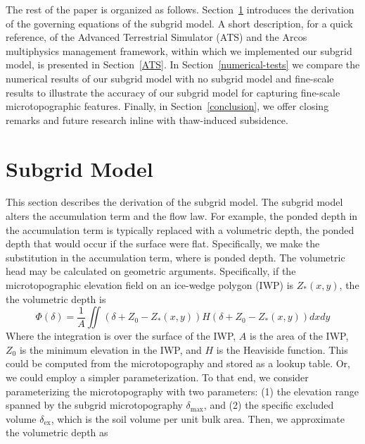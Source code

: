 \documentclass[review,11pt]{elsarticle}
\begin{document}
The rest of the paper is organized as follows. Section~\ref{subgridmodel} introduces the derivation of the governing equations of the subgrid model. A short description, for a quick reference, of the Advanced Terrestrial Simulator (ATS) and the Arcos multiphysics management framework, within which we implemented our subgrid model, is presented in Section~\ref{ATS}. In Section~\ref{numerical-tests} we compare the numerical results of our subgrid model with no subgrid model and fine-scale results to illustrate the accuracy of our subgrid model for capturing fine-scale microtopographic features. Finally, in Section~\ref{conclusion}, we offer closing remarks and future research inline with thaw-induced subsidence.





\section{Subgrid Model}\label{subgridmodel}
This section describes the derivation of the subgrid model. The subgrid model alters the accumulation term and the flow law. For example, the ponded depth in the accumulation term is typically replaced with a volumetric depth, the ponded depth that would occur if the surface were flat. Specifically, we make the substitution in the accumulation term, where is ponded depth. The volumetric head may be calculated on geometric arguments. Specifically, if the microtopographic elevation field on an ice-wedge polygon (IWP) is $Z_*(x,y)$, the the volumetric depth is
\begin{equation}\label{volumetric-depth1}
\Phi (\delta) = \frac{1}{A} \iint \left( \delta + Z_0 - Z_*(x,y) \right ) H \left( \delta + Z_0 - Z_*(x,y) \right ) dx dy
\end{equation}
Where the integration is over the surface of the IWP, $A$ is the area of the IWP, $Z_0$ is the minimum elevation in the IWP, and $H$ is the Heaviside function. This could be computed from the microtopography and stored as a lookup table. Or, we could employ a simpler parameterization. To that end, we consider parameterizing the microtopography with two parameters: (1) the elevation range spanned by the subgrid microtopography $\delta_\text{max}$, and (2) the specific excluded volume $\delta_\text{ex}$, which is the soil volume per unit bulk area. Then, we approximate the volumetric depth as
\end{document}
